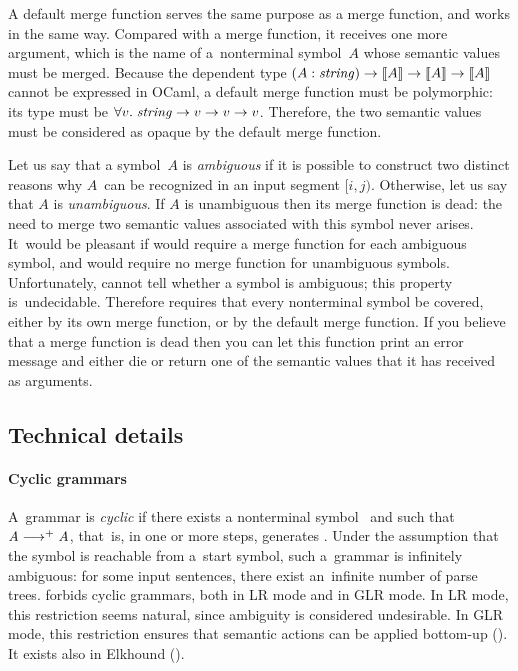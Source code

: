 A default merge function serves the same purpose as a merge function, and
works in the same way. Compared with a merge function, it receives one more
argument, which is the name of a~nonterminal symbol~$A$ whose semantic values
must be merged. Because the dependent type $(A:\mathit{string}) \rightarrow
\llbracket A\rrbracket \rightarrow \llbracket A\rrbracket \rightarrow \llbracket A\rrbracket$ cannot be expressed in OCaml,
a default merge function must be polymorphic: its type must be
$\forall v.\; \mathit{string} \rightarrow v \rightarrow v \rightarrow v$.
Therefore, the two semantic values must be considered as opaque
by the default merge function.

Let us say that a symbol~$A$ is \emph{ambiguous} if it is possible to
construct two distinct reasons why $A$~can be recognized in an input
segment $[i, j)$. Otherwise, let us say that $A$ is \emph{unambiguous}. If $A$
is unambiguous then its merge function is dead: the need to merge two
semantic values associated with this symbol never arises.
%
It~would be pleasant if \menhir would require a merge function for each
ambiguous symbol, and would require no merge function for unambiguous symbols.
%
Unfortunately, \menhir cannot tell whether a symbol is ambiguous;
this property is~undecidable.
%
Therefore \menhir requires that every nonterminal symbol be covered,
either by its own merge function, or by the default merge function.
%
If you believe that a merge function is dead then you can let
this function print an error message and either die or return one of
the semantic values that it has received as arguments.


\subsection{Technical details}
\label{sec:GLR:details}

\paragraph{Cyclic grammars}
\label{sec:GLR:cyclic}

A~grammar is \emph{cyclic} if there exists a nonterminal symbol~
and  such that $\textit{A} \longrightarrow^+ \textit{A}$,
that~is,
in one or more steps,
 generates .
%
Under the assumption that the symbol  is reachable
from a~start symbol,
such a~grammar is infinitely ambiguous:
for some input sentences,
there exist an~infinite number of parse trees.
%
\menhir forbids cyclic grammars,
both in LR mode and in GLR mode.
%
In LR mode, this restriction seems natural,
since ambiguity is considered undesirable.
%
In GLR mode, this restriction ensures that
semantic actions can be applied bottom-up
().
%
It exists also in Elkhound ().

